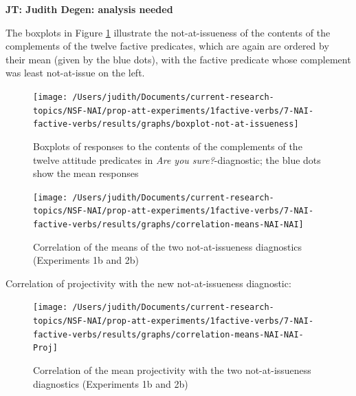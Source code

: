 \documentclass[11pt,fleqn]{article}
\newcommand{\6}{\mbox{$[\hspace*{-.6mm}[$}}
\newcommand{\9}{\mbox{$]\hspace*{-.6mm}]$}}
\newcommand{\jt}[1]{\textbf{\color{blue}JT: #1}}
\begin{document}
\jt{Judith Degen: analysis needed}


The boxplots in Figure \ref{f-exp2b} illustrate the not-at-issueness of the contents of the complements of the twelve factive predicates, which are again are ordered by their mean (given by the blue dots), with the factive predicate whose complement was least not-at-issue on the left.

\begin{figure}[!h]

\begin{center}

\texttt{[image: /Users/judith/Documents/current-research-topics/NSF-NAI/prop-att-experiments/1factive-verbs/7-NAI-factive-verbs/results/graphs/boxplot-not-at-issueness]}
\end{center}

\caption{Boxplots of responses to the contents of the complements of the twelve attitude predicates in {\em Are you sure?}-diagnostic; the blue dots show the mean responses}\label{f-exp2b}
\end{figure}

\begin{figure}[!h]

\begin{center}

\texttt{[image: /Users/judith/Documents/current-research-topics/NSF-NAI/prop-att-experiments/1factive-verbs/7-NAI-factive-verbs/results/graphs/correlation-means-NAI-NAI]}
\end{center}

\caption{Correlation of the means of the two not-at-issueness diagnostics (Experiments 1b and 2b)}\label{f-corr3}
\end{figure}

Correlation of projectivity with the new not-at-issueness diagnostic:

\begin{figure}[!h]

\begin{center}

\texttt{[image: /Users/judith/Documents/current-research-topics/NSF-NAI/prop-att-experiments/1factive-verbs/7-NAI-factive-verbs/results/graphs/correlation-means-NAI-NAI-Proj]}
\end{center}

\caption{Correlation of the mean projectivity with the two not-at-issueness diagnostics (Experiments 1b and 2b)}\label{f-corr4}
\end{figure}
\end{document}
